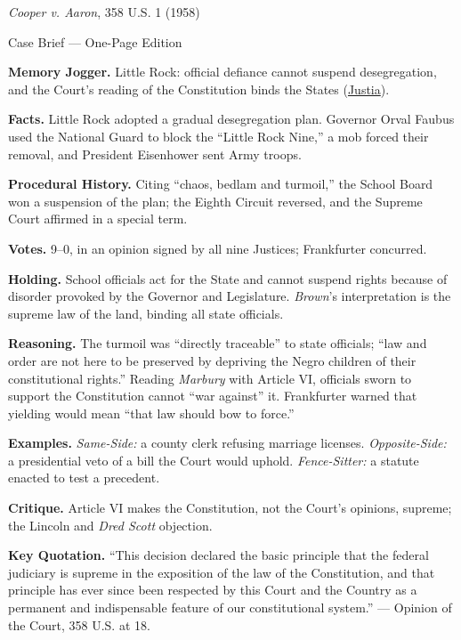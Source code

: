 \documentclass[12pt]{article}
\begin{document}
\begin{center}
{\Large \textit{Cooper v. Aaron}, 358 U.S. 1 (1958)\par}
\vspace{0.3em}
{\normalsize Case Brief --- One-Page Edition\par}
\end{center}

\textbf{Memory Jogger.} Little Rock: official defiance cannot suspend desegregation, and the Court's reading of the Constitution binds the States (\href{https://supreme.justia.com/cases/federal/us/358/1/}{Justia}).

\textbf{Facts.} Little Rock adopted a gradual desegregation plan. Governor Orval Faubus used the National Guard to block the ``Little Rock Nine,'' a mob forced their removal, and President Eisenhower sent Army troops.

\textbf{Procedural History.} Citing ``chaos, bedlam and turmoil,'' the School Board won a suspension of the plan; the Eighth Circuit reversed, and the Supreme Court affirmed in a special term.

\textbf{Votes.} 9--0, in an opinion signed by all nine Justices; Frankfurter concurred.

\textbf{Holding.} School officials act for the State and cannot suspend rights because of disorder provoked by the Governor and Legislature. \textit{Brown}'s interpretation is the supreme law of the land, binding all state officials.

\textbf{Reasoning.} The turmoil was ``directly traceable'' to state officials; ``law and order are not here to be preserved by depriving the Negro children of their constitutional rights.'' Reading \textit{Marbury} with Article VI, officials sworn to support the Constitution cannot ``war against'' it. Frankfurter warned that yielding would mean ``that law should bow to force.''

\textbf{Examples.} \emph{Same-Side:} a county clerk refusing marriage licenses. \emph{Opposite-Side:} a presidential veto of a bill the Court would uphold. \emph{Fence-Sitter:} a statute enacted to test a precedent.

\textbf{Critique.} Article VI makes the Constitution, not the Court's opinions, supreme; the Lincoln and \textit{Dred Scott} objection.

\textbf{Key Quotation.} ``This decision declared the basic principle that the federal judiciary is supreme in the exposition of the law of the Constitution, and that principle has ever since been respected by this Court and the Country as a permanent and indispensable feature of our constitutional system.'' --- Opinion of the Court, 358 U.S. at 18.
\end{document}
